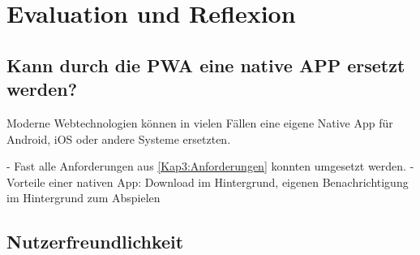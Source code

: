 \chapter{Evaluation und Reflexion}
\label{Kap6}

\section{Kann durch die PWA eine native APP ersetzt werden?}
Moderne Webtechnologien können in vielen Fällen eine eigene Native App für Android, iOS oder andere Systeme ersetzten. 

- Fast alle Anforderungen aus \autoref{Kap3:Anforderungen} konnten umgesetzt werden.
- Vorteile einer nativen App: Download im Hintergrund, eigenen Benachrichtigung im Hintergrund zum Abspielen

\section{Nutzerfreundlichkeit}

